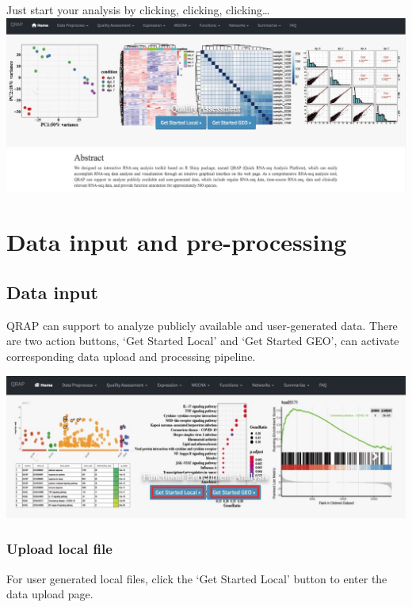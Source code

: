 \documentclass[
  a4paper,
  oneside]{book}
\begin{document}
Just start your analysis by clicking, clicking, clicking\ldots{}\\
\includegraphics{images/launch_interface.jpeg}\\

\hypertarget{data-input-and-pre-processing}{%
\chapter{Data input and pre-processing}\label{data-input-and-pre-processing}}

\hypertarget{data-input}{%
\section{Data input}\label{data-input}}

QRAP can support to analyze publicly available and user-generated data. There are two action buttons, `Get Started Local' and `Get Started GEO', can activate corresponding data upload and processing pipeline.

\includegraphics{images/start_button.jpeg}

\hypertarget{upload-local-file}{%
\subsection{Upload local file}\label{upload-local-file}}

For user generated local files, click the `Get Started Local' button to enter the data upload page.
\end{document}
